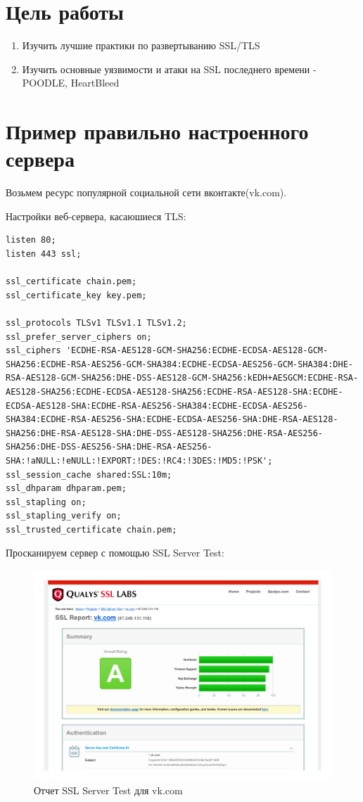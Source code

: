 \section{Цель работы}

\begin{enumerate}
	\item Изучить лучшие практики по развертыванию SSL/TLS
	\item Изучить основные уязвимости и атаки на SSL последнего времени - POODLE, HeartBleed
\end{enumerate}

\section{Пример правильно настроенного сервера}

Возьмем ресурс популярной социальной сети вконтакте(vk.com).

Настройки веб-сервера, касаюшиеся TLS:

\begin{lstlisting}
listen 80;
listen 443 ssl;

ssl_certificate chain.pem;
ssl_certificate_key key.pem;

ssl_protocols TLSv1 TLSv1.1 TLSv1.2;
ssl_prefer_server_ciphers on;
ssl_ciphers 'ECDHE-RSA-AES128-GCM-SHA256:ECDHE-ECDSA-AES128-GCM-SHA256:ECDHE-RSA-AES256-GCM-SHA384:ECDHE-ECDSA-AES256-GCM-SHA384:DHE-RSA-AES128-GCM-SHA256:DHE-DSS-AES128-GCM-SHA256:kEDH+AESGCM:ECDHE-RSA-AES128-SHA256:ECDHE-ECDSA-AES128-SHA256:ECDHE-RSA-AES128-SHA:ECDHE-ECDSA-AES128-SHA:ECDHE-RSA-AES256-SHA384:ECDHE-ECDSA-AES256-SHA384:ECDHE-RSA-AES256-SHA:ECDHE-ECDSA-AES256-SHA:DHE-RSA-AES128-SHA256:DHE-RSA-AES128-SHA:DHE-DSS-AES128-SHA256:DHE-RSA-AES256-SHA256:DHE-DSS-AES256-SHA:DHE-RSA-AES256-SHA:!aNULL:!eNULL:!EXPORT:!DES:!RC4:!3DES:!MD5:!PSK';
ssl_session_cache shared:SSL:10m;
ssl_dhparam dhparam.pem;
ssl_stapling on;
ssl_stapling_verify on;
ssl_trusted_certificate chain.pem;
\end{lstlisting}

Просканируем сервер с помощью SSL Server Test:

\begin{figure}[H]
	\centering
	\includegraphics[width=\textwidth]{images/1.png}
	\caption{Отчет SSL Server Test для vk.com}
\end{figure}

